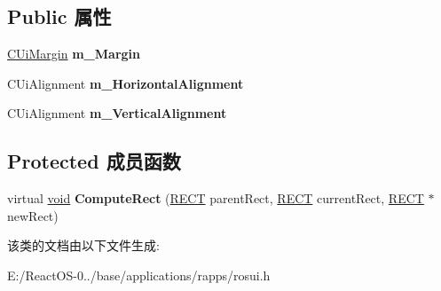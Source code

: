 \subsection*{Public 属性}
\begin{DoxyCompactItemize}
\item 
\mbox{\label{class_c_ui_box_a86afa51f8dcc4f7b7780effd6cd16bb5}} 
\hyperlink{class_c_ui_margin}{C\+Ui\+Margin} {\bfseries m\+\_\+\+Margin}
\item 
\mbox{\label{class_c_ui_box_a6cbad59ec4741352109a9c5bd1564889}} 
C\+Ui\+Alignment {\bfseries m\+\_\+\+Horizontal\+Alignment}
\item 
\mbox{\label{class_c_ui_box_a6f5643ccad6ddaa3f6c643df886c0c80}} 
C\+Ui\+Alignment {\bfseries m\+\_\+\+Vertical\+Alignment}
\end{DoxyCompactItemize}
\subsection*{Protected 成员函数}
\begin{DoxyCompactItemize}
\item 
\mbox{\label{class_c_ui_box_a5c4fe154d7a49674ad155a7a3ffc01e7}} 
virtual \hyperlink{interfacevoid}{void} {\bfseries Compute\+Rect} (\hyperlink{structtag_r_e_c_t}{R\+E\+CT} parent\+Rect, \hyperlink{structtag_r_e_c_t}{R\+E\+CT} current\+Rect, \hyperlink{structtag_r_e_c_t}{R\+E\+CT} $\ast$new\+Rect)
\end{DoxyCompactItemize}


该类的文档由以下文件生成\+:\begin{DoxyCompactItemize}
\item 
E\+:/\+React\+O\+S-\/0../base/applications/rapps/rosui.\+h\end{DoxyCompactItemize}
